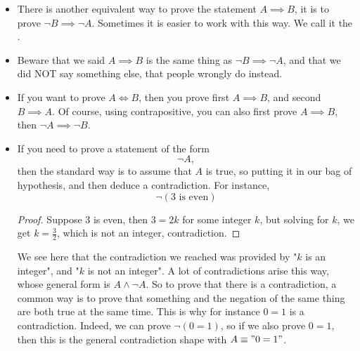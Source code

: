 \begin{itemize}
    \item There is another equivalent way to prove the statement \( A \implies B \), it is to prove \( \neg B \implies \neg A \). Sometimes it is easier to work with this way. We call it the .
    \item Beware that we said \( A \implies B \) is the same thing as \( \neg B \implies \neg A \), and that we did NOT say something else, that people wrongly do instead. 
    \item If you want to prove \( A \iff B \), then you prove first \( A \implies B \), and second \( B \implies A \). Of course, using contrapositive, you can also first prove \( A \implies B \), then \( \neg A \implies \neg B \).
    
    \item If you need to prove a statement of the form 
    \begin{equation*}
        \neg A,
    \end{equation*}
    then the standard way is to assume that \( A \) is true, so putting it in our bag of hypothesis, and then deduce a contradiction. For instance,
    \begin{equation*}
        \neg(3 \text{ is even})
    \end{equation*}
    \begin{proof}
        Suppose \( 3 \) is even, then \( 3 = 2k \) for some integer \( k \), but solving for \( k \), we get \( k = \frac 3 2 \), which is not an integer, contradiction. 
    \end{proof}
    We see here that the contradiction we reached was provided by "\( k \) is an integer", and "\( k \) is not an integer". A lot of contradictions arise this way, whose general form is \( A \land \neg A \). So to prove that there is a contradiction, a common way is to prove that something and the negation of the same thing are both true at the same time. This is why for instance \( 0 = 1 \) is a contradiction. Indeed, we can prove \( \neg (0 = 1) \), so if we also prove \( 0 = 1 \), then this is the general contradiction shape with \( A \equiv "0 = 1" \).
\end{itemize}

